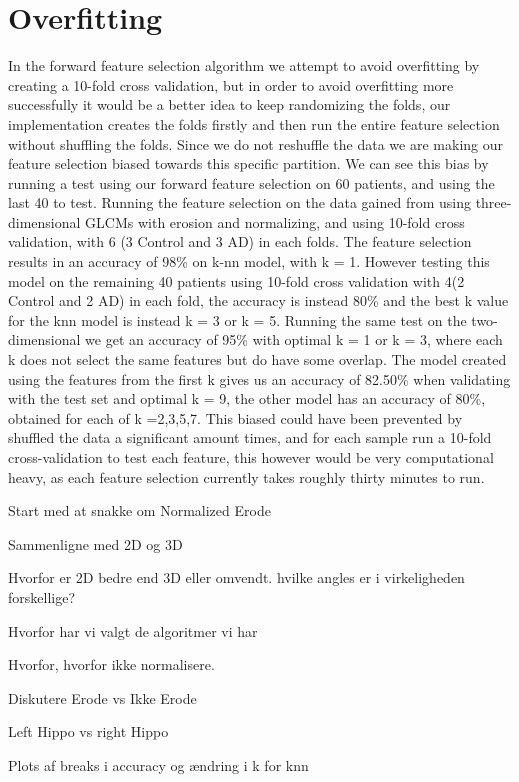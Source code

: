 \section{Overfitting}
In the forward feature selection algorithm we attempt to avoid overfitting by creating a 10-fold cross validation, but in order to avoid overfitting more successfully it would be a better idea to keep randomizing the folds, our implementation creates the folds firstly and then run the entire feature selection without shuffling the folds. Since we do not reshuffle the data we are making our feature selection biased towards this specific partition. We can see this bias by running a test using our forward feature selection on 60 patients, and using the last 40 to test.
Running the feature selection on the data gained from using three-dimensional GLCMs with erosion and normalizing, and using 10-fold cross validation, with 6 (3 Control and 3 AD) in each folds. The feature selection results in an accuracy of 98\% on k-nn model, with k = 1. However testing this model on the remaining 40 patients using 10-fold cross validation with 4(2 Control and 2 AD) in each fold, the accuracy is instead 80\% and the best k value for the knn model is instead  k = 3 or k = 5.
Running the same test on the two-dimensional we get an accuracy of 95\% with optimal k = 1 or k = 3, where each k does not select the same features but do have some overlap. The model created using the features from the first k gives us an accuracy of 82.50\% when validating with the test set and optimal k = 9, the other model has an accuracy of 80\%, obtained for each of k ={2,3,5,7}.
This biased could have been prevented by shuffled the data a significant amount times, and for each sample run a 10-fold cross-validation to test each feature, this however would be very computational heavy, as each feature selection currently takes roughly thirty minutes to run.




Start med at snakke om Normalized Erode

Sammenligne med 2D og 3D

Hvorfor er 2D bedre end 3D eller omvendt. hvilke angles er i virkeligheden forskellige?



Hvorfor har vi valgt de algoritmer vi har

Hvorfor, hvorfor ikke normalisere.

Diskutere Erode vs Ikke Erode

Left Hippo vs right Hippo


Plots af breaks i accuracy og ændring i k for knn 